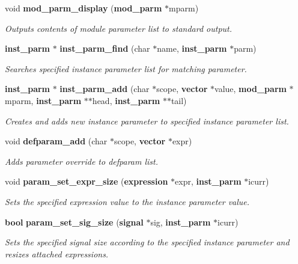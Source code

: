 \begin{CompactItemize}
void {\bf mod\_\-parm\_\-display} ({\bf mod\_\-parm} $\ast$mparm)
\begin{CompactList}\small\item\em Outputs contents of module parameter list to standard output.\item\end{CompactList}\item 
{\bf inst\_\-parm} $\ast$ {\bf inst\_\-parm\_\-find} (char $\ast$name, {\bf inst\_\-parm} $\ast$parm)
\begin{CompactList}\small\item\em Searches specified instance parameter list for matching parameter.\item\end{CompactList}\item 
{\bf inst\_\-parm} $\ast$ {\bf inst\_\-parm\_\-add} (char $\ast$scope, {\bf vector} $\ast$value, {\bf mod\_\-parm} $\ast$mparm, {\bf inst\_\-parm} $\ast$$\ast$head, {\bf inst\_\-parm} $\ast$$\ast$tail)
\begin{CompactList}\small\item\em Creates and adds new instance parameter to specified instance parameter list.\item\end{CompactList}\item 
void {\bf defparam\_\-add} (char $\ast$scope, {\bf vector} $\ast$expr)
\begin{CompactList}\small\item\em Adds parameter override to defparam list.\item\end{CompactList}\item 
void {\bf param\_\-set\_\-expr\_\-size} ({\bf expression} $\ast$expr, {\bf inst\_\-parm} $\ast$icurr)
\begin{CompactList}\small\item\em Sets the specified expression value to the instance parameter value.\item\end{CompactList}\item 
{\bf bool} {\bf param\_\-set\_\-sig\_\-size} ({\bf signal} $\ast$sig, {\bf inst\_\-parm} $\ast$icurr)
\begin{CompactList}\small\item\em Sets the specified signal size according to the specified instance parameter and resizes attached expressions.\item\end{CompactList}\item 

\end{CompactItemize}
